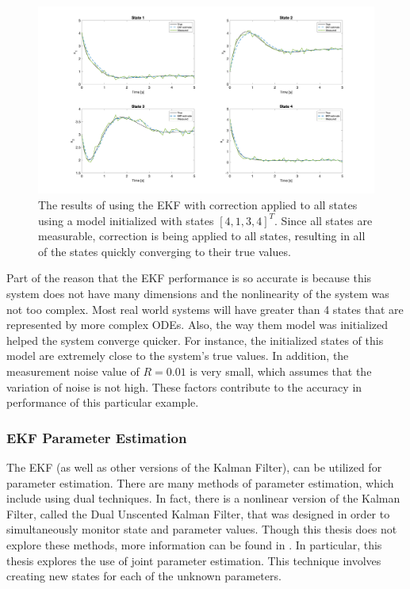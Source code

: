 
\begin{figure}[ht]
    \centering
    \includegraphics[scale = 0.24]{EKF_4state.png}
    \caption{The results of using the EKF with correction applied to all states using a model initialized with states $[4, 1, 3, 4]^T$. Since all states are measurable, correction is being applied to all states, resulting in all of the states quickly converging to their true values.}
    \label{fig:EKF_4state}
  \end{figure}

\noindent Part of the reason that the EKF performance is so accurate is because this system does not have many dimensions and the nonlinearity of the system was not too complex. Most real world systems will have greater than 4 states that are represented by more complex ODEs. Also, the way them model was initialized helped the system converge quicker. For instance, the initialized states of this model are extremely close to the system's true values. In addition, the measurement noise value of $R=0.01$ is very small, which assumes that the variation of noise is not high. These factors contribute to the accuracy in performance of this particular example. 



\clearpage
\subsubsection{EKF Parameter Estimation}
The EKF (as well as other versions of the Kalman Filter), can be utilized for parameter estimation. There are many methods of parameter estimation, which include using dual techniques. In fact, there is a nonlinear version of the Kalman Filter, called the Dual Unscented Kalman Filter, that was designed in order to simultaneously monitor state and parameter values. Though this thesis does not explore these methods, more information can be found in \cite{inbook, article6}. In particular, this thesis explores the use of joint parameter estimation. This technique involves creating new states for each of the unknown parameters. \\ 

